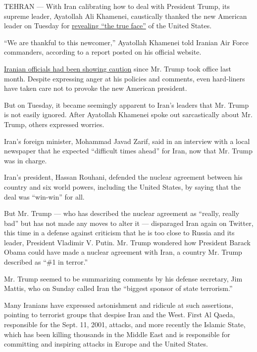 TEHRAN --- With Iran calibrating how to deal with President Trump, its
supreme leader, Ayatollah Ali Khamenei, caustically thanked the new
American leader on Tuesday for
\href{http://english.khamenei.ir/news/4617/We-thank-Trump-for-exposing-the-reality-of-the-U-S-Ayatollah}{revealing
``the true face''} of the United States.

``We are thankful to this newcomer,'' Ayatollah Khamenei told Iranian
Air Force commanders, according to a report posted on his official
website.

\href{https://www.nytimes3xbfgragh.onion/2017/02/03/world/middleeast/iran-trump.html}{Iranian
officials had been showing caution} since Mr. Trump took office last
month. Despite expressing anger at his policies and comments, even
hard-liners have taken care not to provoke the new American president.

But on Tuesday, it became seemingly apparent to Iran's leaders that Mr.
Trump is not easily ignored. After Ayatollah Khamenei spoke out
sarcastically about Mr. Trump, others expressed worries.

Iran's foreign minister, Mohammad Javad Zarif, said in an interview with
a local newspaper that he expected ``difficult times ahead'' for Iran,
now that Mr. Trump was in charge.

Iran's president, Hassan Rouhani, defended the nuclear agreement between
his country and six world powers, including the United States, by saying
that the deal was ``win-win'' for all.

But Mr. Trump --- who has described the nuclear agreement as ``really,
really bad'' but has not made any moves to alter it --- disparaged Iran
again on Twitter, this time in a defense against criticism that he is
too close to Russia and its leader, President Vladimir V. Putin. Mr.
Trump wondered how President Barack Obama could have made a nuclear
agreement with Iran, a country Mr. Trump described as ``\#1 in terror.''

Mr. Trump seemed to be summarizing comments by his defense secretary,
Jim Mattis, who on Sunday called Iran the ``biggest sponsor of state
terrorism.''

Many Iranians have expressed astonishment and ridicule at such
assertions, pointing to terrorist groups that despise Iran and the West.
First Al Qaeda, responsible for the Sept. 11, 2001, attacks, and more
recently the Islamic State, which has been killing thousands in the
Middle East and is responsible for committing and inspiring attacks in
Europe and the United States.

